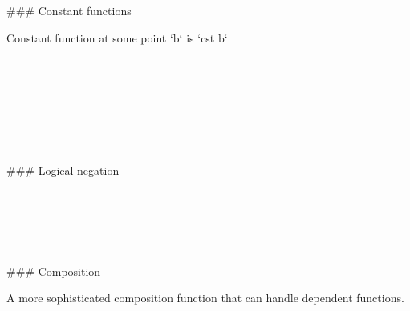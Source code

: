 ### Constant functions

Constant function at some point `b` is `cst b`

\begin{code}%
\>[0]\<%
\\
\>[0][@{}l@{\AgdaIndent{0}}]%
\>[2]\AgdaSymbol{:}\AgdaSpace{}%
\AgdaSpace{}%
\AgdaSymbol{\{}\AgdaSpace{}%
\AgdaSymbol{:}\AgdaSpace{}%
\AgdaSpace{}%
\AgdaSymbol{\}}\AgdaSpace{}%
\AgdaSymbol{\{}\AgdaSpace{}%
\AgdaSymbol{:}\AgdaSpace{}%
\AgdaSpace{}%
\AgdaSymbol{\}}\<%
\\
%
\>[2]\AgdaSpace{}%
\AgdaSymbol{(}\AgdaSpace{}%
\AgdaSymbol{:}\AgdaSpace{}%
\AgdaSymbol{)}\<%
\\
%
\>[2]\AgdaComment{---------}\<%
\\
%
\>[2]\AgdaSpace{}%
\AgdaSymbol{(}\AgdaSpace{}%
\AgdaSpace{}%
\AgdaSymbol{)}\<%
\\
%
\\[\AgdaEmptyExtraSkip]%
\>[0]\AgdaSpace{}%
\AgdaSpace{}%
\AgdaSymbol{=}\AgdaSpace{}%
\AgdaSpace{}%
\AgdaBound{\AgdaUnderscore{}}\AgdaSpace{}%
\AgdaSpace{}%
\<%
\end{code}

### Logical negation

\begin{code}%
\>[0]\<%
\\
\>[0][@{}l@{\AgdaIndent{0}}]%
\>[2]\AgdaSymbol{:}\AgdaSpace{}%
\<%
\\
%
\>[2]\AgdaSpace{}%
\<%
\\
\>[0]\AgdaSpace{}%
\AgdaSpace{}%
\AgdaSymbol{=}\AgdaSpace{}%
\<%
\\
\>[0]\AgdaSpace{}%
\AgdaSpace{}%
\AgdaSymbol{=}\AgdaSpace{}%
\<%
\end{code}

### Composition

A more sophisticated composition function that can handle dependent functions.

